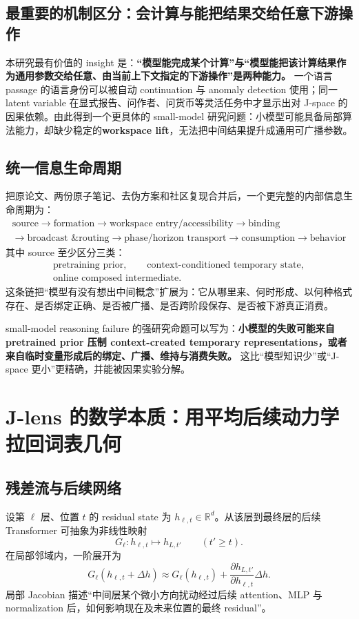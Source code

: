 \documentclass[10.5pt,a4paper]{ctexart}
\begin{document}
\subsection{最重要的机制区分：会计算与能把结果交给任意下游操作}
本研究最有价值的 insight 是：\textbf{“模型能完成某个计算”与“模型能把该计算结果作为通用参数交给任意、由当前上下文指定的下游操作”是两种能力。} 一个语言 passage 的语言身份可以被自动 continuation 与 anomaly detection 使用；同一 latent variable 在显式报告、问作者、问货币等灵活任务中才显示出对 J-space 的因果依赖。由此得到一个更具体的 small-model 研究问题：小模型可能具备局部算法能力，却缺少稳定的\textbf{workspace lift}，无法把中间结果提升成通用可广播参数。

\subsection{统一信息生命周期}
把原论文、两份原子笔记、去伪方案和社区复现合并后，一个更完整的内部信息生命周期为：
\[
\boxed{
\begin{gathered}
\text{source}\rightarrow\text{formation}\rightarrow\text{workspace entry/accessibility}\rightarrow\text{binding}\\
\rightarrow\text{broadcast \& routing}\rightarrow\text{phase/horizon transport}\rightarrow\text{consumption}\rightarrow\text{behavior}
\end{gathered}}
\]
其中 source 至少区分三类：
\[
\begin{gathered}
\text{pretraining prior},\qquad \text{context-conditioned temporary state},\\
\text{online composed intermediate}.
\end{gathered}
\]
这条链把“模型有没有想出中间概念”扩展为：它从哪里来、何时形成、以何种格式存在、是否绑定正确、是否被广播、是否跨阶段保存、是否被下游真正消费。

\begin{inferclaim}
small-model reasoning failure 的强研究命题可以写为：\textbf{小模型的失败可能来自 pretrained prior 压制 context-created temporary representations，或者来自临时变量形成后的绑定、广播、维持与消费失败。} 这比“模型知识少”或“J-space 更小”更精确，并能被因果实验分解。
\end{inferclaim}

\section{J-lens 的数学本质：用平均后续动力学拉回词表几何}

\subsection{残差流与后续网络}
设第 $\ell$ 层、位置 $t$ 的 residual state 为 $h_{\ell,t}\in\mathbb{R}^d$。从该层到最终层的后续 Transformer 可抽象为非线性映射
\[
G_\ell: h_{\ell,t}\mapsto h_{L,t'}\qquad (t'\ge t).
\]
在局部邻域内，一阶展开为
\[
G_\ell(h_{\ell,t}+\Delta h)
\approx G_\ell(h_{\ell,t})
+\frac{\partial h_{L,t'}}{\partial h_{\ell,t}}\Delta h.
\]
局部 Jacobian 描述“中间层某个微小方向扰动经过后续 attention、MLP 与 normalization 后，如何影响现在及未来位置的最终 residual”。
\end{document}
